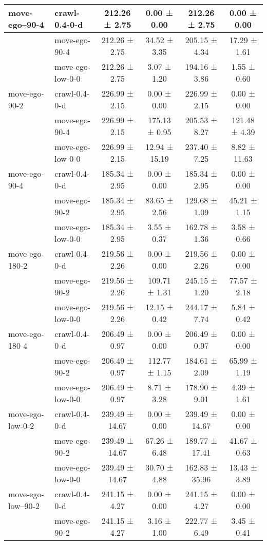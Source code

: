 \begin{tabular}{|l|l|c|c|c|c|}
\hline
move-ego--90-4 & crawl-0.4-0-d & 212.26 ± 2.75 & 0.00 ± 0.00 & 212.26 ± 2.75 & 0.00 ± 0.00 \\
\hline
 & move-ego-90-4 & 212.26 ± 2.75 & 34.52 ± 3.35 & 205.15 ± 4.34 & 17.29 ± 1.61 \\
\hline
 & move-ego-low-0-0 & 212.26 ± 2.75 & 3.07 ± 1.20 & 194.16 ± 3.86 & 1.55 ± 0.60 \\
\hline
move-ego-90-2 & crawl-0.4-0-d & 226.99 ± 2.15 & 0.00 ± 0.00 & 226.99 ± 2.15 & 0.00 ± 0.00 \\
\hline
 & move-ego-90-4 & 226.99 ± 2.15 & 175.13 ± 0.95 & 205.53 ± 8.27 & 121.48 ± 4.39 \\
\hline
 & move-ego-low-0-0 & 226.99 ± 2.15 & 12.94 ± 15.19 & 237.40 ± 7.25 & 8.82 ± 11.63 \\
\hline
move-ego-90-4 & crawl-0.4-0-d & 185.34 ± 2.95 & 0.00 ± 0.00 & 185.34 ± 2.95 & 0.00 ± 0.00 \\
\hline
 & move-ego-90-2 & 185.34 ± 2.95 & 83.65 ± 2.56 & 129.68 ± 1.09 & 45.21 ± 1.15 \\
\hline
 & move-ego-low-0-0 & 185.34 ± 2.95 & 3.55 ± 0.37 & 162.78 ± 1.36 & 3.58 ± 0.66 \\
\hline
move-ego-180-2 & crawl-0.4-0-d & 219.56 ± 2.26 & 0.00 ± 0.00 & 219.56 ± 2.26 & 0.00 ± 0.00 \\
\hline
 & move-ego-90-2 & 219.56 ± 2.26 & 109.71 ± 1.31 & 245.15 ± 1.20 & 77.57 ± 2.18 \\
\hline
 & move-ego-low-0-0 & 219.56 ± 2.26 & 12.15 ± 0.42 & 244.17 ± 7.74 & 5.84 ± 0.42 \\
\hline
move-ego-180-4 & crawl-0.4-0-d & 206.49 ± 0.97 & 0.00 ± 0.00 & 206.49 ± 0.97 & 0.00 ± 0.00 \\
\hline
 & move-ego-90-2 & 206.49 ± 0.97 & 112.77 ± 1.15 & 184.61 ± 2.09 & 65.99 ± 1.19 \\
\hline
 & move-ego-low-0-0 & 206.49 ± 0.97 & 8.71 ± 3.28 & 178.90 ± 9.01 & 4.39 ± 1.61 \\
\hline
move-ego-low-0-2 & crawl-0.4-0-d & 239.49 ± 14.67 & 0.00 ± 0.00 & 239.49 ± 14.67 & 0.00 ± 0.00 \\
\hline
 & move-ego-90-2 & 239.49 ± 14.67 & 67.26 ± 6.48 & 189.77 ± 17.41 & 41.67 ± 0.63 \\
\hline
 & move-ego-low-0-0 & 239.49 ± 14.67 & 30.70 ± 4.88 & 162.83 ± 35.96 & 13.43 ± 3.89 \\
\hline
move-ego-low--90-2 & crawl-0.4-0-d & 241.15 ± 4.27 & 0.00 ± 0.00 & 241.15 ± 4.27 & 0.00 ± 0.00 \\
\hline
 & move-ego-90-2 & 241.15 ± 4.27 & 3.16 ± 1.00 & 222.77 ± 6.49 & 3.45 ± 0.41 \\

\end{tabular}
